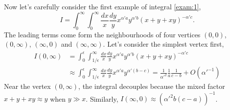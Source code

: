 \documentclass[12pt]{article}
\theoremstyle{definition}
\theoremstyle{plain}
\begin{document}
Now let's carefully consider the first example of integral \eqref{exam:1},
\[
	I=\int_0^\infty \int_0^\infty\frac{dx}{x}\frac{dy}{y}x^{\alpha' a}y^{\alpha' b}(x+y+x y)^{-\alpha' c}.
\]
The leading terms come form the neighbourhoods of four vertices $(0,0)$, $(0,\infty)$, $(\infty,0)$ and $(\infty,\infty)$. Let's consider the simplest vertex first, 
\begin{align*}
	I(0,\infty)&=\int_{0}^\epsilon\int_{1/\epsilon}^\infty \frac{dx}{x}\frac{dy}{y}x^{\alpha' a}y^{\alpha' b}(x+y+xy)^{-\alpha' c} \\
	&\approx \int_{0}^\epsilon\int_{1/\epsilon}^\infty \frac{dx}{x}\frac{dy}{y}x^{\alpha' a}y^{\alpha' (b-c)}= 
	\frac{1}{{\alpha'}^2}\frac{1}{a} \frac{1}{c-b}+O({\alpha'}^{-1})
\end{align*}
Near the vertex $(0,\infty)$, the integral decouples because the mixed factor $x+y+xy \approx y$ when $y \gg x$.  Similarly, $I(\infty,0)\approx ({\alpha'}^2 b (c-a))^{-1}$. 
\end{document}
